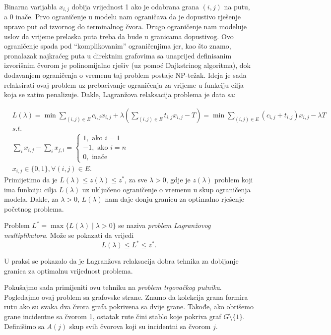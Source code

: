 \documentclass[a4paper, utf8, 11pt, colorlinks]{book}
\begin{document}
Binarna varijabla $x_{i,j}$ dobija vrijednost 1 ako je odabrana grana $(i,j)$ na   putu, a 0 inače.  
Prvo ograničenje u modelu nam ograničava da je dopustivo rješenje upravo put od izvornog do terminalnog čvora. Drugo ograničenje nam modeluje uslov da vrijeme prelaska puta treba da bude u  granicama dopustivog. Ovo ograničenje spada pod ``komplikovanim'' ograničenjima jer, kao što znamo,  pronalazak najkraćeg puta u direktnim grafovima sa unaprijed definisanim izvorišnim čvorom je polinomijalno rješiv (uz pomoć Dajkstrinog algoritma), dok dodavanjem ograničenja o vremenu taj problem postaje NP-težak. Ideja je sada relaksirati ovaj problem uz prebacivanje ograničenja za vrijeme u funkciju cilja koja se zatim penalizuje. 
Dakle, Lagranžova relaksacija problema je data sa:

\begin{align*}
       &L(\lambda)= \min\sum_{(i,j) \in E }c_{i,j}x_{i,j}  + \lambda(\sum_{(i,j) \in E} t_{i,j} x_{i,j} - T ) = \min \sum_{(i,j) \in E} (c_{i,j} + t_{i,j} )x_{i,j} - \lambda T \\
        &{s.t. }\\
    & \sum_{i} x_{i,j} - \sum_{i} x_{j,i} = \begin{cases}  
                                               1, \mbox{ ako } i=1 \\
                                              -1, \mbox{ ako } i=n \\
                                               0, \mbox{ inače }
                                            \end{cases} \\
     & x_{i,j} \in \{0, 1 \}, \forall (i,j) \in E.
\end{align*}
Primijetimo da je $L(\lambda) \leq z(\lambda)  \leq z^*$, za sve $\lambda > 0$, gdje je $z(\lambda)$ problem koji ima funkciju cilja $L(\lambda)$ uz uključeno ograničenje o vremenu u skup ograničenja modela. Dakle, za $\lambda >0$, $L(\lambda)$ nam daje donju granicu za optimalno rješenje početnog problema. 

Problem $L^* = \max \{ L(\lambda) \mid \lambda > 0  \}$ se naziva \emph{problem Lagranžovog multiplikatora}. Može se pokazati da vrijedi 
$$ L(\lambda) \leq L^* \leq z^*.$$

U praksi se pokazalo da je Lagranžova relaksacija dobra tehnika za dobijanje granica za optimalnu vrijednost problema. 

Pokušajmo sada primijeniti ovu tehniku na \emph{problem trgovačkog putnika}.  Pogledajmo ovaj problem sa grafovske strane. Znamo da kolekcija grana formira rutu ako su svaka dva čvora grafa pokrivena sa dvije grane. Takođe, ako obrišemo grane incidentne sa čvorom 1, ostatak rute čini stablo koje pokriva graf  $G\setminus \{1\}$.  
Definišimo sa $A(j)$ skup svih čvorova koji su incidentni sa čvorom $j$. 
\end{document}
